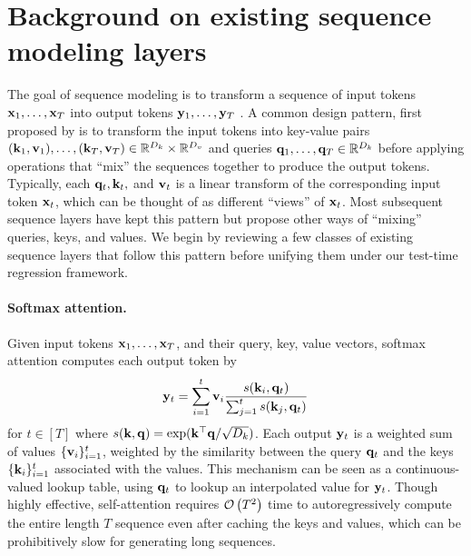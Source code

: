 \documentclass[notitlepage, 11pt]{article}
\newcommand*{\dkey}{{D_k}}
\newcommand*{\dval}{{D_v}}
\begin{document}
\section{Background on existing sequence modeling layers}\label{sec:existing-archs}
The goal of sequence modeling is to transform a sequence of input tokens $\mathbf{x}_1, \ldots, \mathbf{x}_T$ into output tokens $\mathbf{y}_1, \ldots, \mathbf{y}_T$ \citep{Sutskever2014SequenceSequenceLearning}.
A common design pattern, first proposed by \citet{Vaswani2017AttentionAllYou} is to transform the input tokens into key-value pairs $(\kbf_1, \vbf_1), \ldots, (\kbf_T, \vbf_T) \in \reals^{\dkey}\times\reals^{\dval}$ and queries $\qbf_1, \ldots, \qbf_T \in \reals^\dkey$ before applying operations that ``mix'' the sequences together to produce the output tokens. 
Typically, each $\mathbf{q}_t, \mathbf{k}_t,$ and $\mathbf{v}_t$ is a linear transform of the corresponding input token $\mathbf{x}_t$, which can be thought of as different ``views'' of $\mathbf{x}_t$.
Most subsequent sequence layers have kept this pattern but propose other ways of ``mixing'' queries, keys, and values.
We begin by reviewing a few classes of existing sequence layers that follow this pattern before unifying them under our test-time regression framework.

\paragraph{Softmax attention.}
Given input tokens $\mathbf{x}_1, \ldots, \mathbf{x}_T$, and their query, key, value vectors, softmax attention \citep{Vaswani2017AttentionAllYou} computes each output token by
\begin{align}
    \mathbf{y}_t = \sum_{i=1}^t \mathbf{v}_i \frac{s(\mathbf{k}_i, \mathbf{q}_t)}{\sum_{j=1}^t s(\mathbf{k}_j, \mathbf{q}_t)} \label{eqn:softmax-attention}
\end{align}
for $t\in [T]$ where $s(\kbf, \qbf) = \exp(\kbf\transpose\qbf/\sqrt{\dkey})$.
Each output $\mathbf{y}_t$ is a weighted sum of values $\{\mathbf{v}_i\}_{i=1}^t$, weighted by the similarity between the query $\mathbf{q}_t$ and the keys $\{\mathbf{k}_i\}_{i=1}^t$ associated with the values.
This mechanism can be seen as a continuous-valued lookup table, using $\mathbf{q}_t$ to lookup an interpolated value for $\mathbf{y}_t$.
Though highly effective, self-attention requires $\mathcal{O}\left( T^2 \right)$ time to autoregressively compute the entire length $T$ sequence even after caching the keys and values, which can be prohibitively slow for generating long sequences.
\end{document}
